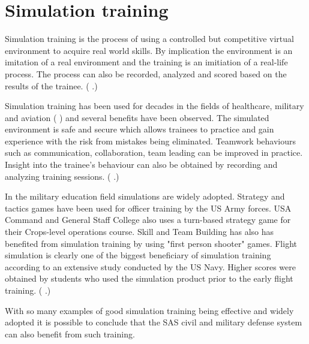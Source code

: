 \documentclass[12pt, a4paper,oneside, nocenter]{thesis}
\renewcommand{\citep}[1]{(\citeauthor{#1} \citeyear{#1}.)}
\newcommand{\citeyeartitlexamkinline}[1]{(\usebibentry{#1}{title} \citeyear{#1})}
\begin{document}
\section{Simulation training}
Simulation training is the process of using a controlled but competitive virtual environment to acquire real world skills. By implication the environment is an imitation of a real environment and the training is an imitiation of a real-life process. The process can also be recorded, analyzed and scored based on the results of the trainee. \citep{enterprise-simulation}
\par
Simulation training has been used for decades in the fields of  healthcare, military and aviation \citeyeartitlexamkinline{simulation-training-history} and several benefits have been observed. The simulated environment is safe and secure which allows trainees to practice and gain experience with the risk from mistakes being eliminated. Teamwork behaviours such as communication, collaboration, team leading can be improved in practice. Insight into the trainee's behaviour can also be obtained by recording and analyzing training sessions. \citep{medical-sim-training}
\par
In the military education field simulations are widely adopted. Strategy and tactics games have been used for officer training by the US Army forces. USA Command and General Staff College also uses a turn-based strategy game for their Crops-level operations course. Skill and Team Building has also has benefited from simulation training by using "first person shooter" games. Flight simulation is clearly one of the biggest beneficiary of simulation training according to an extensive study conducted by the US Navy. Higher scores were obtained by students who used the simulation product prior to the early flight training. \citep{games-sim-mil}
\par
With so many examples of good simulation training being effective and widely adopted it is possible to conclude that the SAS civil and military defense system can also benefit from such training.
\\
\end{document}

